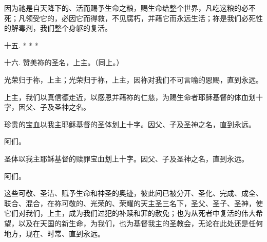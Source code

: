 因为祂是自天降下的、活而赐予生命之粮，赐生命给整个世界，凡吃这粮的必不死；凡领受它的，必因它而得救，不见腐朽，并藉它而永远生活；祢是我们必死性的解毒剂，我们整个身躯的复活。\par

十五. * * *\par

十六. 赞美祢的圣名，上主。（同上。）\par

\par

光荣归于祢，上主；光荣归于祢，上主，因祢对我们不可言喻的恩赐，直到永远。\par

\par

上主，我们以真信德走近，以感恩并藉祢的仁慈，为赐生命者耶稣基督的体血划十字，因父、子及圣神之名。\par

\par

珍贵的宝血以我主耶稣基督的圣体划上十字。因父、子及圣神之名，直到永远。\par

\par

阿们。\par

\par

圣体以我主耶稣基督的赎罪宝血划上十字。因父、子及圣神之名，直到永远。\par

\par

阿们。\par

\par

这些可敬、圣洁、赋予生命和神圣的奥迹，彼此间已被分开、圣化、完成、成全、联合、混合，在祢可敬的、光荣的、荣耀的天主圣三名下，圣父、圣子、圣神，使它们对我们，上主，成为我们过犯的补赎和罪的赦免；也为从死者中复活的伟大希望，以及在天国的新生命，为我们，也为基督我主的圣教会，无论在此处还是任何地方，现在、时常、直到永远。\par

